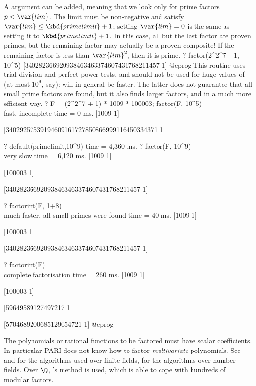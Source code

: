 A  argument  can be added, meaning that we look only for
prime factors $p < \var{lim}$. The limit  must be non-negative and
satisfy
$\var{lim} \leq \kbd{primelimit} + 1$; setting $\var{lim}=0$ is the same
as setting it to $\kbd{primelimit} + 1$. In this case, all but the last
factor
are proven primes, but the remaining factor may actually be a proven composite!
If the remaining factor is less than $\var{lim}^2$, then it is prime.
\bprog
? factor(2^2^7 +1, 10^5)
[340282366920938463463374607431768211457 1]
@eprog\noindent
This routine uses trial division and perfect power tests, and should not be
used for huge values
of  (at most $10^9$, say):  will in general
be faster. The latter does not guarantee that all small prime factors are
found, but it also finds larger factors, and in a much more efficient way.
\bprog
? F = (2^2^7 + 1) * 1009 * 100003; factor(F, 10^5)  \\ fast, incomplete
time = 0 ms.
[1009 1]

[34029257539194609161727850866999116450334371 1]

? default(primelimit,10^9)
time = 4,360 ms.
? factor(F, 10^9)    \\ very slow
time = 6,120 ms.
[1009 1]

[100003 1]

[340282366920938463463374607431768211457 1]

? factorint(F, 1+8)  \\ much faster, all small primes were found
time = 40 ms.
[1009 1]

[100003 1]

[340282366920938463463374607431768211457 1]

? factorint(F)   \\ complete factorisation
time = 260 ms.
[1009 1]

[100003 1]

[59649589127497217 1]

[5704689200685129054721 1]
@eprog

The polynomials or rational functions to be factored must have scalar
coefficients. In particular PARI does not know how to factor
\emph{multivariate} polynomials. See  and  for
the algorithms used over finite fields,  for the algorithms
over number fields. Over $\Q$, 's method is used, which is
able to cope with hundreds of modular factors.

